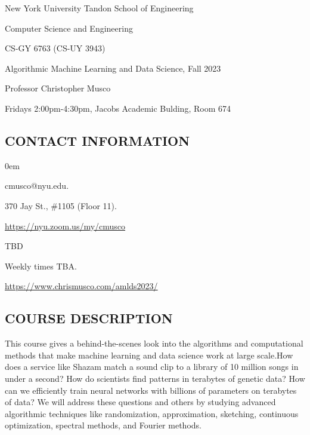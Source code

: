 \documentclass[10pt]{article}
\begin{document}
\begin{center}
	\normalsize
	New York University Tandon School of Engineering
	
	Computer Science and Engineering
	\medskip
	
	\large
	CS-GY 6763 (CS-UY 3943)
	 
	Algorithmic Machine Learning and Data Science, Fall 2023
	\medskip
	
	\normalsize
	Professor Christopher Musco
	
	Fridays 2:00pm-4:30pm, Jacobs Academic Bulding, Room 674
\end{center} 

\subsection{CONTACT INFORMATION}
\begin{description}\itemsep0em 
	\item[Email:] cmusco@nyu.edu.
	\item[Office:] 370 Jay St., \#1105 (Floor 11).
	\item[Virtual Zoom Office:] \url{https://nyu.zoom.us/my/cmusco}
	\item[Ed Discussion Forum (for questions):] TBD
	\item[Office Hours:] Weekly times TBA.
	\item[Course Webspage:] \url{https://www.chrismusco.com/amlds2023/}
\end{description} 

\subsection{COURSE DESCRIPTION}
This course gives a behind-the-scenes look into the algorithms and computational methods that make machine learning and data science work at large scale.How does a service like Shazam match a sound clip to a library of 10 million songs in under a second? How do scientists find patterns in terabytes of genetic data? How can we efficiently train neural networks with billions of parameters on terabytes of data? We will address these questions and others by studying advanced algorithmic techniques like randomization, approximation, sketching, continuous optimization, spectral methods, and Fourier methods.
\end{document}
